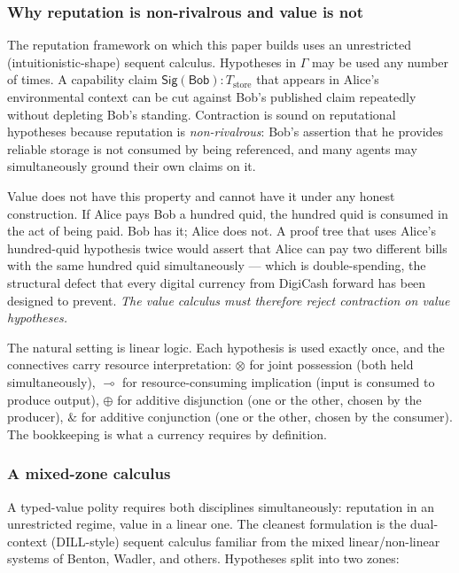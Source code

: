 \documentclass[11pt]{article}
\newcommand{\Sig}{\mathsf{Sig}}
\begin{document}
\subsubsection*{Why reputation is non-rivalrous and value is not}

The reputation framework on which this paper builds uses an unrestricted (intuitionistic-shape) sequent calculus. Hypotheses in $\Gamma$ may be used any number of times. A capability claim $\Sig(\mathsf{Bob}) : T_{\text{store}}$ that appears in Alice's environmental context can be cut against Bob's published claim repeatedly without depleting Bob's standing. Contraction is sound on reputational hypotheses because reputation is \emph{non-rivalrous}: Bob's assertion that he provides reliable storage is not consumed by being referenced, and many agents may simultaneously ground their own claims on it.

Value does not have this property and cannot have it under any honest construction. If Alice pays Bob a hundred quid, the hundred quid is consumed in the act of being paid. Bob has it; Alice does not. A proof tree that uses Alice's hundred-quid hypothesis twice would assert that Alice can pay two different bills with the same hundred quid simultaneously --- which is double-spending, the structural defect that every digital currency from DigiCash forward has been designed to prevent. \emph{The value calculus must therefore reject contraction on value hypotheses.}

The natural setting is linear logic. Each hypothesis is used exactly once, and the connectives carry resource interpretation: $\otimes$ for joint possession (both held simultaneously), $\multimap$ for resource-consuming implication (input is consumed to produce output), $\oplus$ for additive disjunction (one or the other, chosen by the producer), $\&$ for additive conjunction (one or the other, chosen by the consumer). The bookkeeping is what a currency requires by definition.

\subsubsection*{A mixed-zone calculus}

A typed-value polity requires both disciplines simultaneously: reputation in an unrestricted regime, value in a linear one. The cleanest formulation is the dual-context (DILL-style) sequent calculus familiar from the mixed linear/non-linear systems of Benton, Wadler, and others. Hypotheses split into two zones:
\end{document}
